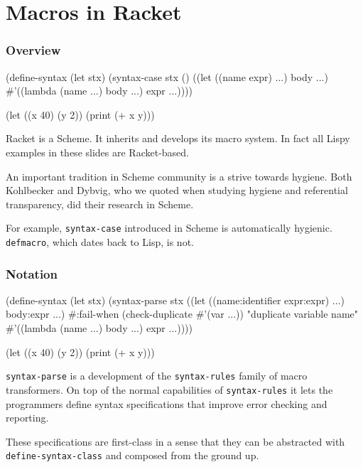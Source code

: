 \documentclass[hyperref={bookmarks=false}]{beamer}
\begin{document}
\section{Macros in Racket}

\begin{frame}[fragile]
\frametitle{Overview}

\begin{lstlistinglike}
\begin{semiverbatim}
(define-syntax (let stx)
  (syntax-case stx ()
    ((let ((name expr) ...) body ...)
     #'((lambda (name ...) body ...) expr ...))))

(let ((x 40) (y 2)) (print (+ x y)))
\end{semiverbatim}
\end{lstlistinglike}

Racket is a Scheme. It inherits and develops its macro system.
In fact all Lispy examples in these slides are Racket-based.

An important tradition in Scheme community is a strive towards hygiene.
Both Kohlbecker and Dybvig, who we quoted when studying hygiene and referential
transparency, did their research in Scheme.

For example, \texttt{syntax-case} introduced in Scheme is automatically hygienic.
\texttt{defmacro}, which dates back to Lisp, is not.
\end{frame}

\begin{frame}[fragile]
\frametitle{Notation}

\begin{lstlistinglike}
\begin{semiverbatim}
(define-syntax (let stx)
  (syntax-parse stx
    ((let ((name\alert{:identifier} expr\alert{:expr}) ...) body\alert{:expr} ...)
     \alert{#:fail-when} (check-duplicate #'(var ...))
                  "duplicate variable name"
     #'((lambda (name ...) body ...) expr ...))))

(let ((x 40) (y 2)) (print (+ x y)))
\end{semiverbatim}
\end{lstlistinglike}

\texttt{syntax-parse} is a development of the \texttt{syntax-rules} family of macro transformers.
On top of the normal capabilities of \texttt{syntax-rules} it lets the programmers define
syntax specifications that improve error checking and reporting.

These specifications are first-class in a sense that they can be abstracted with \texttt{define-syntax-class} and composed from the ground up.
\end{frame}
\end{document}
